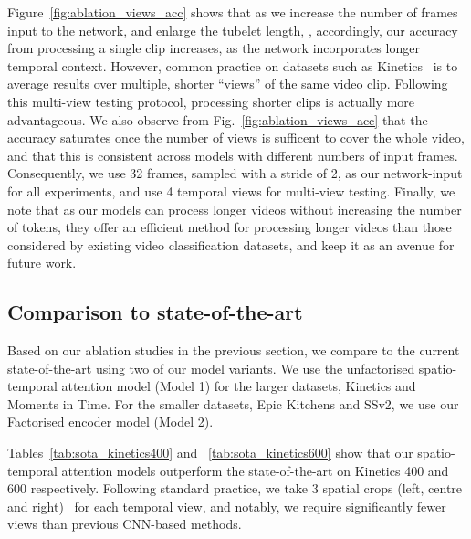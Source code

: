\documentclass[10pt,twocolumn,letterpaper]{article}
\makeatletter
\renewcommand{\paragraph}{\@startsection{paragraph}{4}{\z@}{1.625ex \@plus 1ex \@minus .2ex}{-1em}{\normalfont\normalsize\bfseries}}
\makeatother
\begin{document}
Figure~\ref{fig:ablation_views_acc} shows that as we increase the number of frames input to the network, and enlarge the tubelet length, , accordingly, our accuracy from processing a single clip increases, as the network incorporates longer temporal context.
However, common practice on datasets such as Kinetics~\cite{feichtenhofer_iccv_2019, wang_cvpr_2018, li_tea_cvpr_2020} is to average results over multiple, shorter ``views'' of the same video clip.
Following this multi-view testing protocol, processing shorter clips is actually more advantageous.
We also observe from Fig.~\ref{fig:ablation_views_acc} that the accuracy saturates once the number of views is sufficent to cover the whole video, and that this is consistent across models with different numbers of input frames.
Consequently, we use 32 frames, sampled with a stride of 2, as our network-input for all experiments, and use 4 temporal views for multi-view testing.
Finally, we note that as our models can process longer videos without increasing the number of tokens, they offer an efficient method for processing longer videos than those considered by existing video classification datasets, and keep it as an avenue for future work.



\subsection{Comparison to state-of-the-art}\label{sec:exp_sota_comparison}
Based on our ablation studies in the previous section, we compare to the current state-of-the-art using two of our model variants.
We use the unfactorised spatio-temporal attention model (Model 1) for the larger datasets, Kinetics and Moments in Time.
For the smaller datasets, Epic Kitchens and SSv2, we use our Factorised encoder model (Model 2).

\vspace{-0\baselineskip}
\paragraph{Kinetics}
Tables~\ref{tab:sota_kinetics400} and ~\ref{tab:sota_kinetics600} show that our spatio-temporal attention models outperform the state-of-the-art on Kinetics 400 and 600 respectively.
Following standard practice, we take 3 spatial crops (left, centre and right)~\cite{feichtenhofer_iccv_2019,feichtenhofer_cvpr_2020,tran_iccv_2019,wang_cvpr_2018} for each temporal view, and notably, we require significantly fewer views than previous CNN-based methods.
\end{document}
